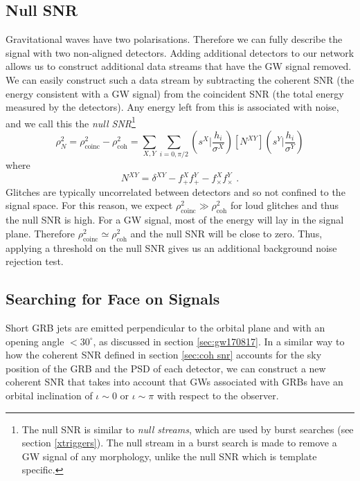 \documentclass[11pt]{cuthesis}
\newcommand{\fs}{\text{ .}}
\begin{document}
\subsection{Null SNR} \label{sec:null snr}
Gravitational waves have two polarisations. Therefore we can fully describe the signal with two non-aligned detectors. Adding additional detectors to our network allows us to construct additional data streams that have the GW signal removed. We can easily construct such a data stream by subtracting the coherent SNR (the energy consistent with a GW signal) from the coincident SNR (the total energy measured by the detectors). Any energy left from this is associated with noise, and we call this the \textit{null SNR}\footnote{The null SNR is similar to \textit{null streams}, which are used by burst searches (see section \ref{xtriggers}). The null stream in a burst search is made to remove a GW signal of any morphology, unlike the null SNR which is template specific.}
\begin{equation} \label{null snr}
\rho_N^2 = \rho_\text{coinc}^2 - \rho_\text{coh}^2 = \sum_{X,Y} \sum_{i=0,\pi/2} \left( s^X \bigg| \frac{h_i}{\sigma^X} \right) [N^{XY}]  \left( s^Y \bigg| \frac{h_i}{\sigma^Y} \right)
\end{equation} 
where
\begin{equation}
N^{XY} = \delta^{XY} - f^X_{+}f^Y_{+} - f^X_{\times}f^Y_{\times} \fs
\end{equation}
Glitches are typically uncorrelated between detectors and so not confined to the signal space. For this reason, we expect $\rho_\text{coinc}^2 \gg \rho_\text{coh}^2$ for loud glitches and thus the null SNR is high. For a GW signal, most of the energy will lay in the signal plane. Therefore $\rho_\text{coinc}^2 \simeq \rho_\text{coh}^2$ and the null SNR will be close to zero. Thus, applying a threshold on the null SNR gives us an additional background noise rejection test.

\subsection{Searching for Face on Signals} \label{sec:circ pol}
Short GRB jets are emitted perpendicular to the orbital plane and with an opening angle $<30^\circ$, as discussed in section \ref{sec:gw170817}. In a similar way to how the coherent SNR defined in section \ref{sec:coh snr} accounts for the sky position of the GRB and the PSD of each detector, we can construct a new coherent SNR that takes into account that GWs associated with GRBs have an orbital inclination of $\iota \sim 0$ or $\iota \sim \pi$ with respect to the observer.
\end{document}
